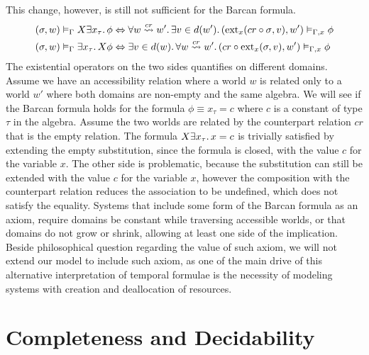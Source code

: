 This change, however, is still not sufficient for the Barcan formula.
\[
  \begin{split}
    ({\sigma}, {w}) \vDash_{\Gamma} {X{\exists {x_\tau} \ldotp {\phi}}}
      &\Leftrightarrow \forall {w \overset{cr}{\rightsquigarrow} w'} \ldotp {\exists {v \in d(w')} \ldotp {({\text{ext}_{x}({cr \circ \sigma},{v})}, {w'}) \vDash_{\Gamma,x} {\phi}}} \\
    ({\sigma}, {w}) \vDash_{\Gamma} {\exists {x_\tau} \ldotp {X{\phi}}}
      &\Leftrightarrow \exists {v \in d(w)} \ldotp {\forall {w \overset{cr}{\rightsquigarrow} w'} \ldotp {({cr \circ \text{ext}_{x}({\sigma},{v})}, {w'}) \vDash_{\Gamma,x} {\phi}}}
  \end{split}
\]
The existential operators on the two sides quantifies on different domains. Assume we have an accessibility relation
where a world $w$ is related only to a world $w'$ where both domains are non-empty and the same algebra.  We will see if
the Barcan formula holds for the formula $\phi \equiv x_\tau = c$ where $c$ is a constant of type $\tau$ in the algebra.
Assume the two worlds are related by the counterpart relation $cr$ that is the empty relation. The formula
$X{\exists {x_\tau} \ldotp {x = c}}$ is trivially satisfied by extending the empty substitution, since the formula is
closed, with the value $c$ for the variable $x$. The other side is problematic, because the substitution can
still be extended with the value $c$ for the variable $x$, however the composition with the counterpart relation reduces
the association to be undefined, which does not satisfy the equality. Systems that include some form of the Barcan
formula as an axiom, require domains be constant while traversing accessible worlds, or that domains do not grow or
shrink, allowing at least one side of the implication. Beside philosophical question regarding the value of such axiom,
we will not extend our model to include such axiom, as one of the main drive of this alternative interpretation of
temporal formulae is the necessity of modeling systems with creation and deallocation of resources.

\section{Completeness and Decidability}

